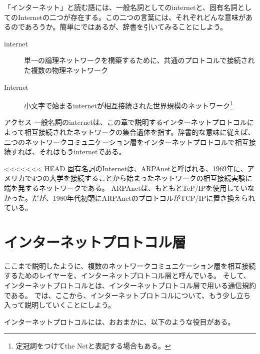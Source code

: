 「インターネット」と読む語には、一般名詞としてのinternetと、固有名詞としてのInternetの二つが存在する。この二つの言葉には、それぞれどんな意味があるのであろうか。簡単にではあるが、辞書を引いてみることにしよう。

\begin{description}
\item[internet]単一の論理ネットワークを構築するために、共通のプロトコルで接続された複数の物理ネットワーク
\item[Internet]小文字で始まるinternetが相互接続された世界規模のネットワーク\footnote{定冠詞をつけてthe Netと表記する場合もある。}
\end{description}
アクセス
一般名詞のinternetは、この章で説明するインターネットプロトコルによって相互接続されたネットワークの集合遺体を指す。辞書的な意味に従えば、二つのネットワークコミュニケーション層をインターネットプロトコルで相互接続すれば、それはもうinternetである。

<<<<<<< HEAD
固有名詞のInternetは、ARPAnetと呼ばれる、1969年に、アメリカで4つの大学を接続することから始まったネットワークの相互接続実験に端を発するネットワークである。
ARPAnetは、もともとTcP/IPを使用していなかった。だが、1980年代初頭にARPAnetのプロトコルがTCP/IPに置き換えられている。

\section{インターネットプロトコル層}

ここまで説明したように、複数のネットワークコミュニケーション層を相互接続するためのレイヤーを、インターネットプロトコル層と呼んでいる。
そして、インターネットプロトコルとは、インターネットプロトコル層で用いる通信規約である。
では、ここから、インターネットプロトコルについて、もう少し立ち入って説明していくことにしよう。

インターネットプロトコルには、おおまかに、以下のような役目がある。


